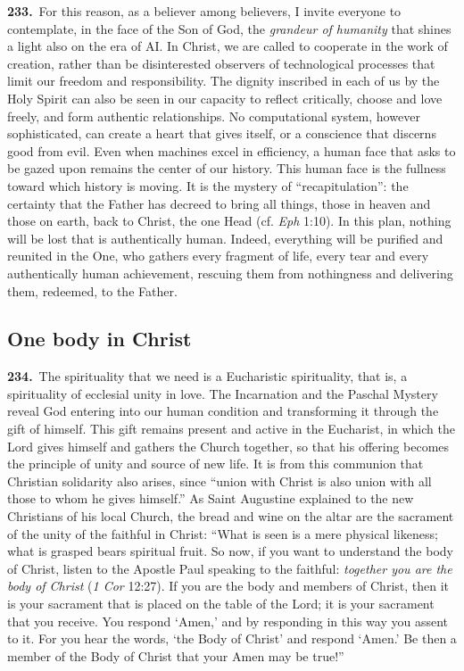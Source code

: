 \documentclass{article}
\begin{document}
\textbf{233.}\ For this reason, as a believer among believers, I invite everyone to contemplate, in the face of the Son of God, the \emph{grandeur of humanity} that shines a light also on the era of AI. In Christ, we are called to cooperate in the work of creation, rather than be disinterested observers of technological processes that limit our freedom and responsibility.\cite{n212} The dignity inscribed in each of us by the Holy Spirit can also be seen in our capacity to reflect critically, choose and love freely, and form authentic relationships. No computational system, however sophisticated, can create a heart that gives itself, or a conscience that discerns good from evil. Even when machines excel in efficiency, a human face that asks to be gazed upon remains the center of our history. This human face is the fullness toward which history is moving. It is the mystery of ``recapitulation'': the certainty that the Father has decreed to bring all things, those in heaven and those on earth, back to Christ, the one Head (cf. \emph{Eph} 1:10). In this plan, nothing will be lost that is authentically human. Indeed, everything will be purified and reunited in the One, who gathers every fragment of life, every tear and every authentically human achievement, rescuing them from nothingness and delivering them, redeemed, to the Father.

\subsection{One body in Christ}

\textbf{234.}\ The spirituality that we need is a Eucharistic spirituality, that is, a spirituality of ecclesial unity in love. The Incarnation and the Paschal Mystery reveal God entering into our human condition and transforming it through the gift of himself. This gift remains present and active in the Eucharist, in which the Lord gives himself and gathers the Church together, so that his offering becomes the principle of unity and source of new life. It is from this communion that Christian solidarity also arises, since ``union with Christ is also union with all those to whom he gives himself.''\cite{n213} As Saint Augustine explained to the new Christians of his local Church, the bread and wine on the altar are the sacrament of the unity of the faithful in Christ: ``What is seen is a mere physical likeness; what is grasped bears spiritual fruit. So now, if you want to understand the body of Christ, listen to the Apostle Paul speaking to the faithful: \emph{together you are the body of Christ} (\emph{1 Cor} 12:27). If you are the body and members of Christ, then it is your sacrament that is placed on the table of the Lord; it is your sacrament that you receive. You respond `Amen,' and by responding in this way you assent to it. For you hear the words, `the Body of Christ' and respond `Amen.' Be then a member of the Body of Christ that your Amen may be true!''\cite{n214}
\end{document}
